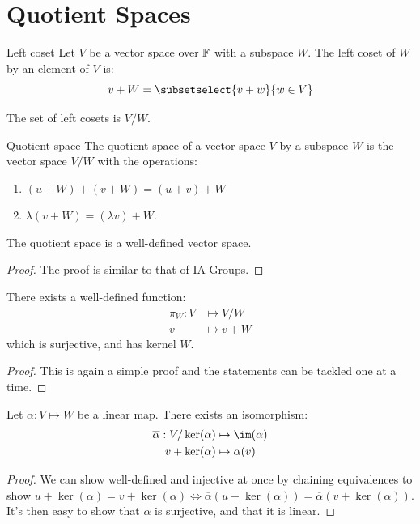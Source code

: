 \documentclass[../Main.tex]{subfiles}
\begin{document}
\section{Quotient Spaces}
\begin{definition}{Left coset}
    Let $V$ be a vector space over $\mathbb{F}$ with a subspace $W$. The \underline{left coset} of $W$ by an element of $V$ is:
    \begin{equation*}
        v + W = \subsetselect{v + w}{w \in V}
    \end{equation*}
\end{definition}
The set of left cosets is $V / W$.
\begin{definition}{Quotient space}
    The \underline{quotient space} of a vector space $V$ by a subspace $W$ is the vector space $V / W$ with the operations:
    \begin{enumerate}
        \item $(u + W) + (v + W) = (u + v) + W$
        \item $\lambda (v + W) = (\lambda v) + W$.
    \end{enumerate}
\end{definition}
\begin{proposition}
    The quotient space is a well-defined vector space.
    \label{propQuotientSpace}
\end{proposition}
\begin{proof}
    The proof is similar to that of IA Groups.
\end{proof}
\begin{proposition}
    There exists a well-defined function:
    \begin{align*}
        \pi_W : V &\mapsto V / W\\
        v &\mapsto v + W
    \end{align*}
    which is surjective, and has kernel $W$.
    \label{propQuotientMap}
\end{proposition}
\begin{proof}
    This is again a simple proof and the statements can be tackled one at a time.
\end{proof}
\begin{theorem}
    Let $\alpha : V \mapsto W$ be a linear map. There exists an isomorphism:
    \begin{align*}
        \overline{\alpha} : V / \ker(\alpha) &\mapsto \im(\alpha)\\
        v + \ker(\alpha) &\mapsto \alpha(v)
    \end{align*}
    \label{thmIsomorphism}
\end{theorem}
\begin{proof}
    We can show well-defined and injective at once by chaining equivalences to show $u + \ker(\alpha) = v + \ker(\alpha) \iff \overline{\alpha}(u + \ker(\alpha)) = \overline{\alpha}(v + \ker(\alpha))$. It's then easy to show that $\overline{\alpha}$ is surjective, and that it is linear.
\end{proof}
\end{document}
